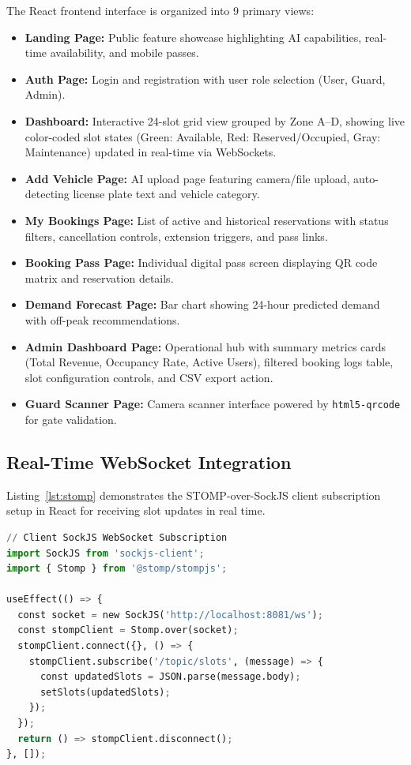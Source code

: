 \documentclass[conference,10pt]{IEEEtran}
\begin{document}
The React frontend interface is organized into 9 primary views:
\begin{itemize}[leftmargin=*]
    \item \textbf{Landing Page:} Public feature showcase highlighting AI capabilities, real-time availability, and mobile passes.
    \item \textbf{Auth Page:} Login and registration with user role selection (User, Guard, Admin).
    \item \textbf{Dashboard:} Interactive 24-slot grid view grouped by Zone A--D, showing live color-coded slot states (Green: Available, Red: Reserved/Occupied, Gray: Maintenance) updated in real-time via WebSockets.
    \item \textbf{Add Vehicle Page:} AI upload page featuring camera/file upload, auto-detecting license plate text and vehicle category.
    \item \textbf{My Bookings Page:} List of active and historical reservations with status filters, cancellation controls, extension triggers, and pass links.
    \item \textbf{Booking Pass Page:} Individual digital pass screen displaying QR code matrix and reservation details.
    \item \textbf{Demand Forecast Page:} Bar chart showing 24-hour predicted demand with off-peak recommendations.
    \item \textbf{Admin Dashboard Page:} Operational hub with summary metrics cards (Total Revenue, Occupancy Rate, Active Users), filtered booking logs table, slot configuration controls, and CSV export action.
    \item \textbf{Guard Scanner Page:} Camera scanner interface powered by \texttt{html5-qrcode} for gate validation.
\end{itemize}

\subsection{Real-Time WebSocket Integration}

Listing~\ref{lst:stomp} demonstrates the STOMP-over-SockJS client subscription setup in React for receiving slot updates in real time.

\begin{lstlisting}[language=Python, caption={STOMP WebSocket Connection Logic in Frontend}, label={lst:stomp}]
// Client SockJS WebSocket Subscription
import SockJS from 'sockjs-client';
import { Stomp } from '@stomp/stompjs';

useEffect(() => {
  const socket = new SockJS('http://localhost:8081/ws');
  const stompClient = Stomp.over(socket);
  stompClient.connect({}, () => {
    stompClient.subscribe('/topic/slots', (message) => {
      const updatedSlots = JSON.parse(message.body);
      setSlots(updatedSlots);
    });
  });
  return () => stompClient.disconnect();
}, []);
\end{lstlisting}
\end{document}
